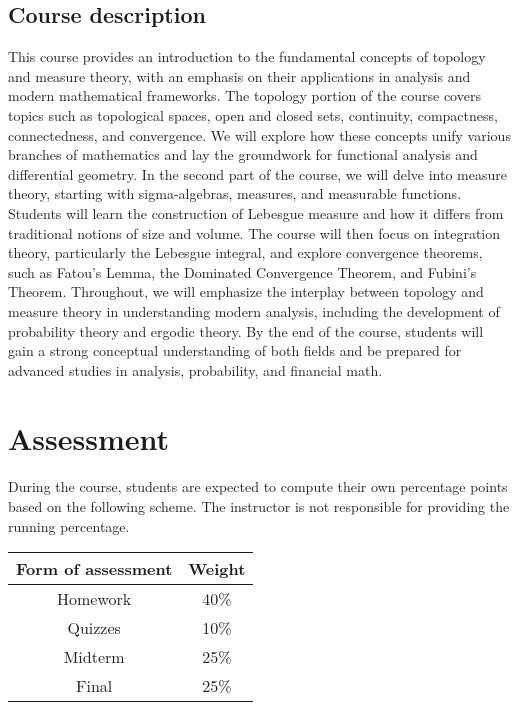 \documentclass[
  openany]{book}
\begin{document}
\subsection*{Course description}\label{course-description}

This course provides an introduction to the fundamental concepts of topology and measure theory, with an emphasis on their applications in analysis and modern mathematical frameworks. The topology portion of the course covers topics such as topological spaces, open and closed sets, continuity, compactness, connectedness, and convergence. We will explore how these concepts unify various branches of mathematics and lay the groundwork for functional analysis and differential geometry.
In the second part of the course, we will delve into measure theory, starting with sigma-algebras, measures, and measurable functions. Students will learn the construction of Lebesgue measure and how it differs from traditional notions of size and volume. The course will then focus on integration theory, particularly the Lebesgue integral, and explore convergence theorems, such as Fatou's Lemma, the Dominated Convergence Theorem, and Fubini's Theorem. Throughout, we will emphasize the interplay between topology and measure theory in understanding modern analysis, including the development of probability theory and ergodic theory.
By the end of the course, students will gain a strong conceptual understanding of both fields and be prepared for advanced studies in analysis, probability, and financial math.

\section*{Assessment}\label{assessment}

During the course, students are expected to compute their own percentage
points based on the following scheme.
The instructor is not responsible for providing the running percentage.

\begin{longtable}[]{@{}cc@{}}
\toprule\noalign{}
\textbf{Form of assessment} & \textbf{Weight} \\
\midrule\noalign{}
\endhead
\bottomrule\noalign{}
\endlastfoot
Homework & 40\% \\
Quizzes & 10\% \\
Midterm & 25\% \\
Final & 25\% \\
\end{longtable}
\end{document}
